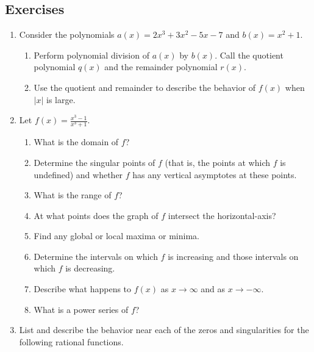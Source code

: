\documentclass[
]{book}
\providecommand{\tightlist}{%
  \setlength{\itemsep}{0pt}\setlength{\parskip}{0pt}}
\theoremstyle{definition}
\theoremstyle{definition}
\theoremstyle{definition}
\theoremstyle{remark}
\begin{document}
\hypertarget{exercises-33}{%
\subsection{Exercises}\label{exercises-33}}

\begin{enumerate}
\def\labelenumi{\arabic{enumi}.}
\item
  Consider the polynomials \(a(x)=2x^3+3x^2-5x-7\) and \(b(x)=x^2+1\).

  \begin{enumerate}
  \def\labelenumii{\alph{enumii}.}
  \tightlist
  \item
    Perform polynomial division of \(a(x)\) by \(b(x)\). Call the quotient polynomial \(q(x)\) and the remainder polynomial \(r(x)\).
  \item
    Use the quotient and remainder to describe the behavior of \(f(x)\) when \(|x|\) is large.
  \end{enumerate}
\item
  Let \(\displaystyle{f(x)=\frac{x^3-1}{x^3+1}}\).

  \begin{enumerate}
  \def\labelenumii{\alph{enumii}.}
  \tightlist
  \item
    What is the domain of \(f\)?
  \item
    Determine the singular points of \(f\) (that is, the points at which \(f\) is undefined) and whether \(f\) has any vertical asymptotes at these points.
  \item
    What is the range of \(f\)?
  \item
    At what points does the graph of \(f\) intersect the horizontal-axis?
  \item
    Find any global or local maxima or minima.
  \item
    Determine the intervals on which \(f\) is increasing and those intervals on which \(f\) is decreasing.
  \item
    Describe what happens to \(f(x)\) as \(x\rightarrow \infty\) and as \(x \rightarrow -\infty\).
  \item
    What is a power series of \(f\)?
  \end{enumerate}
\item
  List and describe the behavior near each of the zeros and singularities for the following rational functions.


\end{enumerate}
\end{document}

